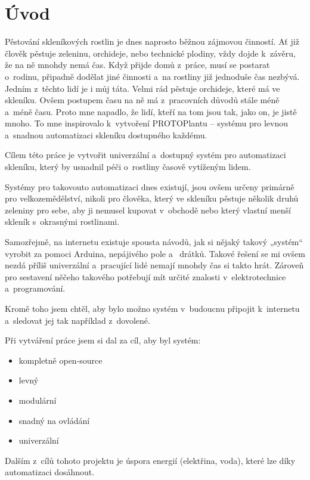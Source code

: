 \chapter*{Úvod}
Pěstování skleníkových rostlin je dnes naprosto běžnou zájmovou činností. 
Ať již člověk pěstuje zeleninu, orchideje, nebo technické plodiny, vždy dojde k~závěru, že na ně mnohdy nemá čas.
Když přijde domů z~práce, musí se postarat o~rodinu, připadně dodělat jiné činnosti a~na rostliny již jednoduše čas nezbývá.
Jedním z~těchto lidí je i můj táta.
Velmi rád pěstuje orchideje, které má ve skleníku.
Ovšem postupem času na ně má z~pracovních důvodů stále méně a~méně času.
Proto mne napadlo, že lidí, kteří na tom jsou tak, jako on, je jistě mnoho.
To mne inspirovalo k~vytvoření PROTOPlantu -- systému pro levnou a~snadnou automatizaci skleníku dostupného každému. 

Cílem této práce je vytvořit univerzální a~dostupný systém pro automatizaci skleníku, který by usnadnil péči o~rostliny časově vytíženým lidem. 

Systémy pro takovouto automatizaci dnes existují, jsou ovšem určeny primárně pro velkozemědělství, nikoli pro člověka, který ve skleníku pěstuje několik druhů zeleniny pro sebe, aby ji nemusel kupovat v~obchodě nebo který vlastní menší skleník s~okrasnými rostlinami. 

Samozřejmě, na internetu existuje spousta návodů, jak si nějaký takový „systém“ vyrobit za pomoci Arduina, nepájivého pole a~ drátků.
Takové řešení se mi ovšem nezdá příliš univerzální a~pracující lidé nemají mnohdy čas si takto hrát.
Zároveň pro sestavení něčeho takového potřebují mít určité znalosti v~elektrotechnice a~programování.

Kromě toho jsem chtěl, aby bylo možno systém v~budoucnu připojit k~internetu a~sledovat jej tak například z~dovolené.
\newline

Při vytváření práce jsem si dal za cíl, aby byl systém:
\begin{itemize}
    \item kompletně open-source
    \item levný
    \item modulární
    \item snadný na ovládání
    \item univerzální
\end{itemize}

Dalším z~cílů tohoto projektu je úspora energií (elektřina, voda), které lze díky automatizaci dosáhnout.

\newpage
